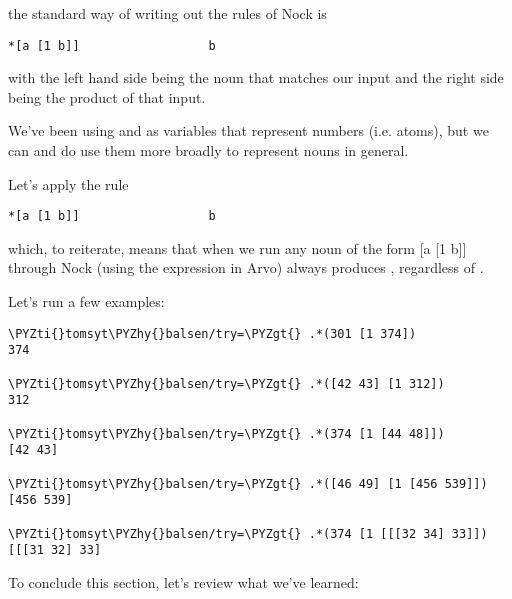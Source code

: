 the standard way of writing out the rules of Nock is 

\begin{framed_shaded}
\begin{Verbatim}[fontsize=\relsize{-2.5},fontseries=b,commandchars=\\\{\}]
*[a [1 b]]                  b
\end{Verbatim}
\end{framed_shaded}

with the left hand side being the noun that matches our input and the right
side being the product of that input. 

We've been using  and  as variables that represent numbers (i.e. atoms),
but we can and do use them more broadly to represent nouns in general.

Let's apply the rule

\begin{framed_shaded}
\begin{Verbatim}[fontsize=\relsize{-2.5},fontseries=b,commandchars=\\\{\}]
*[a [1 b]]                  b
\end{Verbatim}
\end{framed_shaded}

which, to reiterate, means that when we run any noun of the form [a [1 b]]
through Nock (using the expression  in Arvo) always produces ,
regardless of .

Let's run a few examples:

\begin{framed_shaded}
\begin{Verbatim}[fontsize=\relsize{-2.5},fontseries=b,commandchars=\\\{\}]
\PYZti{}tomsyt\PYZhy{}balsen/try=\PYZgt{} .*(301 [1 374])
374

\PYZti{}tomsyt\PYZhy{}balsen/try=\PYZgt{} .*([42 43] [1 312])
312

\PYZti{}tomsyt\PYZhy{}balsen/try=\PYZgt{} .*(374 [1 [44 48]])
[42 43]

\PYZti{}tomsyt\PYZhy{}balsen/try=\PYZgt{} .*([46 49] [1 [456 539]])
[456 539]

\PYZti{}tomsyt\PYZhy{}balsen/try=\PYZgt{} .*(374 [1 [[[32 34] 33]])
[[[31 32] 33]
\end{Verbatim}
\end{framed_shaded}

To conclude this section, let's review what we've learned:

